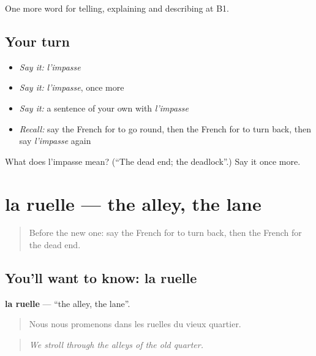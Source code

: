 \begin{grammarlens}[title={What you've built}]
One more word for telling, explaining and describing at B1.
\end{grammarlens}

\subsection*{Your turn}
\begin{itemize}
\raggedright
  \item \emph{Say it:} \emph{l'impasse}
  \item \emph{Say it:} \emph{l'impasse}, once more
  \item \emph{Say it:} a sentence of your own with \emph{l'impasse}
  \item \emph{Recall:} say the French for to go round, then the French for to turn back, then say \emph{l'impasse} again
\end{itemize}

\begin{tcolorbox}[breakable,colback=teal!4,colframe=teal!35!black,title={Before you move on}]
What does l'impasse mean? (\textquotedblleft{}The dead end; the deadlock\textquotedblright{}.) Say it once more.
\end{tcolorbox}
\section[la ruelle]{la ruelle — the alley, the lane}

\label{lesson:FR-C437-ruelle}



\begin{quote}
Before the new one: say the French for to turn back, then the French for the dead end.
\end{quote}

\subsection*{You'll want to know: la ruelle}
\textbf{la ruelle} — \textquotedblleft{}the alley, the lane\textquotedblright{}.

\begin{quote}
Nous nous promenons dans les ruelles du vieux quartier.
\end{quote}

\begin{quote}
\emph{We stroll through the alleys of the old quarter.}
\end{quote}


